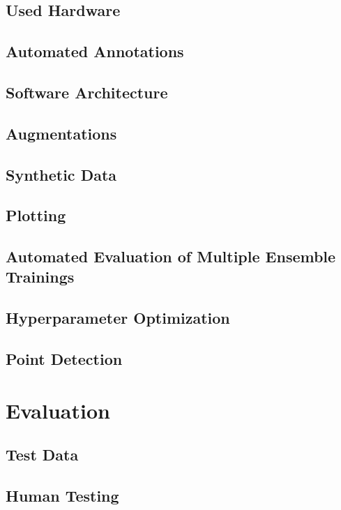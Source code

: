 \documentclass[10pt]{book}
\begin{document}
\section{Used Hardware}

\section{Automated Annotations}

\section{Software Architecture}

\section{Augmentations}

\section{Synthetic Data}

\section{Plotting}

\section{Automated Evaluation of Multiple Ensemble Trainings}

\section{Hyperparameter Optimization}

\section{Point Detection}

\chapter{Evaluation}
\label{chap:eval}

\section{Test Data}

\section{Human Testing}
\end{document}

